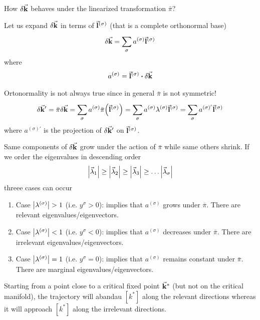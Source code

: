\documentclass[../main/main.tex]{subfiles}
\begin{document}
How \( \delta \va{k} \) behaves under the linearized transformation \( \bar{\pi }  \)?

Let us expand \( \delta \va{k} \) in terms of \( \va{l}^{(\sigma )} \) (that is a complete orthonormal base)
\begin{equation}
  \delta \va{k} = \sum_{\sigma }^{} a^{(\sigma )} \va{l}^{(\sigma )}
\end{equation}
where
\begin{equation}
  a^{(\sigma )} = \va{l}^{(\sigma )} \vdot \delta \va{k}
\end{equation}
\begin{remark}
Ortonormality is not always true since in general \( \bar{\pi }  \) is not symmetric!
\begin{equation}
  \delta \va{k}' = \bar{\pi } \delta \va{k} = \sum_{\sigma }^{} a^{(\sigma )} \bar{\pi } \qty(\va{l}^{(\sigma )})
  = \sum_{\sigma }^{} a^{(\sigma )} \lambda ^{(\sigma )} \va{l}^{(\sigma )}
  = \sum_{\sigma }^{} a^{(\sigma )'} \va{l}^{(\sigma )}
\end{equation}
where \( a^{(\sigma )'} \) is the projection of \( \delta \va{k}' \) on \( \va{l}^{(\sigma )} \).
  \end{remark}
Same components of \( \delta \va{k} \) grow under the action of \( \bar{\pi }  \) while same others shrink.
If we order the eigenvalues in descending order
\begin{equation}
  \abs{\va{\lambda }_1} \ge \abs{\va{\lambda }_2} \ge \abs{\va{\lambda }_3} \ge \dots \abs{\va{\lambda }_{\sigma}} 
\end{equation}
threee cases can occur
\begin{enumerate}
\item Case \( \abs{\lambda ^{(\sigma )}} > 1 \) (i.e. \( y^\sigma > 0\)): implies that \( a^{(\sigma )} \) grows under \( \bar{\pi }  \). There are relevant eigenvalues/eigenvectors.

\item Case \( \abs{\lambda ^{(\sigma )}} < 1 \) (i.e. \( y^\sigma < 0\)): implies that \( a^{(\sigma )} \) decreases under \( \bar{\pi }  \). There are irrelevant eigenvalues/eigenvectors.

\item Case \( \abs{\lambda ^{(\sigma )}} = 1 \) (i.e. \( y^\sigma =  0\)): implies that \( a^{(\sigma )} \) remains constant under \( \bar{\pi }  \). There are marginal eigenvalues/eigenvectors.
\end{enumerate}

Starting from a point close to a critical fixed point \( \va{k}^* \) (but not on the critical manifold), the trajectory will abandau \( [k^*] \) along the relevant directions whereas it will approach \( [k^*] \) along the irrelevant directions.
\end{document}

